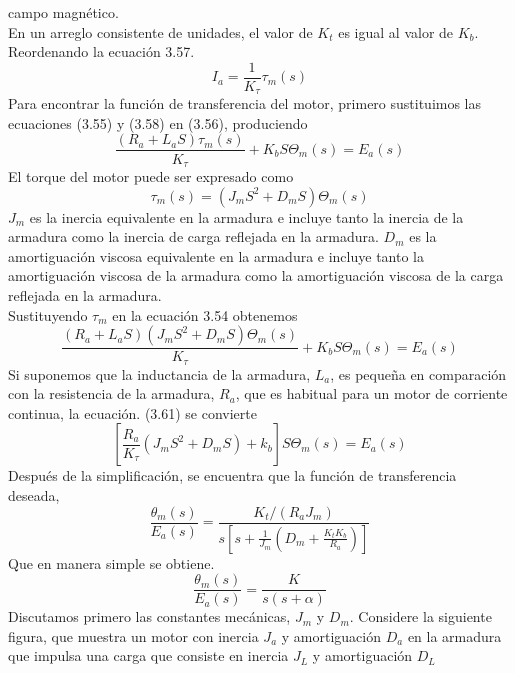 campo magnético.\\
En un arreglo consistente de unidades, el valor de $K_t$ es igual al valor de $K_b$. Reordenando la ecuación 3.57.
\begin{equation}
	I_a = \frac{1}{K_\tau} \tau_m (s)
\end{equation}
Para encontrar la función de transferencia del motor, primero sustituimos las ecuaciones (3.55) y (3.58) en (3.56), produciendo
\begin{equation}
	\frac{(R_a + L_aS) \tau_m(s)}{K_\tau} + K_bS \Theta_m(s) = E_a(s)
\end{equation}
El torque del motor puede ser expresado como
\begin{equation}
	\tau_m(s) = (J_mS^2 + D_mS) \Theta_m(s)
\end{equation}
$J_m$ es la inercia equivalente en la armadura e incluye tanto la inercia de la armadura como la inercia de carga reflejada en la armadura. $D_m$ es la amortiguación viscosa
equivalente en la armadura e incluye tanto la amortiguación viscosa de la armadura como la amortiguación viscosa de la carga reflejada en la armadura.\\
Sustituyendo $\tau_m$ en la ecuación 3.54 obtenemos
\begin{equation}
	\frac{(R_a + L_aS) (J_mS^2 + D_mS) \Theta_m(s) }{K_\tau} + K_bS \Theta_m(s) = E_a(s)
\end{equation}
Si suponemos que la inductancia de la armadura, $L_a$, es pequeña en comparación con la resistencia de la armadura, $R_a$, que es habitual para un motor de corriente continua,
la ecuación. (3.61) se convierte
\begin{equation}
	\left[ \frac{R_a }{K_\tau} (J_mS^2 + D_mS) + k_b \right] S\Theta_m(s)  = E_a(s)
\end{equation}
Después de la simplificación, se encuentra que la función de transferencia deseada,
\begin{equation}
	\frac{\theta_m (s)}{E_a(s)} = \frac{K_t / (R_aJ_m)}{s \left[ s + \frac{1}{J_m} \left( D_m + \frac{K_tK_b}{R_a} \right) \right]}
\end{equation}
Que en manera simple se obtiene.
\begin{equation}
	\frac{\theta_m (s)}{E_a(s)} = \frac{K}{s(s+\alpha)}
\end{equation}
Discutamos primero las constantes mecánicas, $J_m$ y $D_m$. Considere la siguiente figura, que muestra un motor con inercia $J_a$
y amortiguación $D_a$ en la armadura que impulsa una carga que consiste en inercia $J_L$ y amortiguación $D_L$
